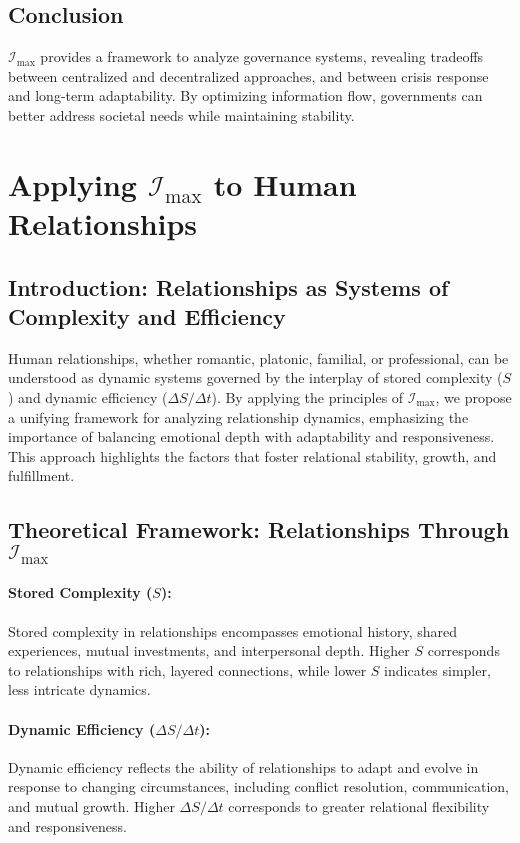 \documentclass[12pt]{article}
\begin{document}
\subsection{Conclusion}
\(\mathcal{I}_{\text{max}}\) provides a framework to analyze governance systems, revealing tradeoffs between centralized and decentralized approaches, and between crisis response and long-term adaptability. By optimizing information flow, governments can better address societal needs while maintaining stability.


\section{Applying \(\mathcal{I}_{\text{max}}\) to Human Relationships}

\subsection{Introduction: Relationships as Systems of Complexity and Efficiency}
Human relationships, whether romantic, platonic, familial, or professional, can be understood as dynamic systems governed by the interplay of stored complexity (\( S \)) and dynamic efficiency (\( \Delta S / \Delta t \)). By applying the principles of \(\mathcal{I}_{\text{max}}\), we propose a unifying framework for analyzing relationship dynamics, emphasizing the importance of balancing emotional depth with adaptability and responsiveness. This approach highlights the factors that foster relational stability, growth, and fulfillment.

\subsection{Theoretical Framework: Relationships Through \(\mathcal{I}_{\text{max}}\)}
\paragraph{Stored Complexity (\( S \)):}
Stored complexity in relationships encompasses emotional history, shared experiences, mutual investments, and interpersonal depth. Higher \( S \) corresponds to relationships with rich, layered connections, while lower \( S \) indicates simpler, less intricate dynamics.

\paragraph{Dynamic Efficiency (\( \Delta S / \Delta t \)):}
Dynamic efficiency reflects the ability of relationships to adapt and evolve in response to changing circumstances, including conflict resolution, communication, and mutual growth. Higher \( \Delta S / \Delta t \) corresponds to greater relational flexibility and responsiveness.
\end{document}
